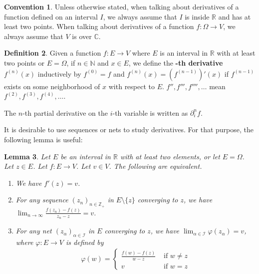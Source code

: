 \documentclass[12pt,b5paper,notitlepage]{article}
\theoremstyle{definition}
\newtheorem{df}{Definition}[section]
\newtheorem{cv}[df]{Convention}
\theoremstyle{plain}
\newtheorem{lm}[df]{Lemma}
\newcommand{\mc}{\mathcal}
\newcommand{\Cbb}{\mathbb C}
\newcommand{\Nbb}{\mathbb N}
\newcommand{\Zbb}{\mathbb Z}
\newcommand{\Rbb}{\mathbb R}
\newcommand{\dps}{\displaystyle}
\numberwithin{equation}{section}
\begin{document}
\begin{cv}\label{lb332}
Unless otherwise stated, when talking about derivatives of a function defined on an interval $I$, we always assume that $I$ is inside $\Rbb$ and has at least two points.  When talking about derivatives of a function $f:\Omega\rightarrow V$, we always assume that $V$ is over $\Cbb$.
\end{cv}



\begin{df}
Given a function $f:E\rightarrow V$ where $E$ is an interval in $\Rbb$ with at least two points or $E=\Omega$, if $n\in\Nbb$ and $x\in E$, we define the \textbf{-th derivative} $f^{(n)}(x)$   inductively by $f^{(0)}=f$ and $f^{(n)}(x)=(f^{(n-1)})'(x)$ if $f^{(n-1)}$ exists on some neighborhood of $x$ with respect to $E$. $f'',f''',f'''',\dots$ mean $f^{(2)},f^{(3)},f^{(4)},\dots$.

The $n$-th partial derivative on the $i$-th variable is written as $\partial_i^nf$. \hfill\qedsymbol
\end{df}


It is desirable to use sequences or nets to study derivatives. For that purpose, the following lemma is useful:

\begin{lm}\label{lb322}
Let $E$ be  an interval in $\Rbb$ with at least two elements, or let $E=\Omega$. Let $z\in E$. Let $f:E\rightarrow V$. Let $v\in V$. 
The following are equivalent.
\begin{enumerate}[label=(\arabic*)]
\item We have $f'(z)=v$.
\item For any sequence $(z_n)_{n\in\Zbb_+}$ in $E\setminus\{z\}$ converging to $z$, we have $\dps\lim_{n\rightarrow\infty} \frac{f(z_n)-f(z)}{z_n-z}=v$.
\item For any net $(z_\alpha)_{\alpha\in\mc I}$ in $E$ converging to $z$, we have $\dps\lim_{\alpha\in\mc I}\varphi(z_\alpha)=v$, where $\varphi:E\rightarrow V$ is defined by
\begin{align}\label{eq110}
\varphi(w)=\left\{
\begin{array}{ll}
\dps\frac{f(w)-f(z)}{w-z}&\text{ if }w\neq z\\[2ex]
v&\text{ if }w=z
\end{array}
\right.
\end{align}
\end{enumerate}
\end{lm}
\end{document}
